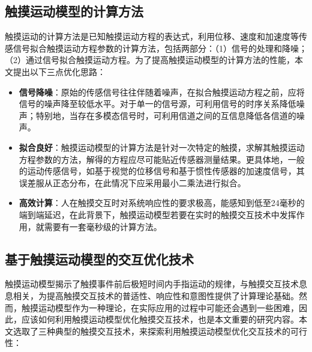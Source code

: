 
\subsection{触摸运动模型的计算方法}

触摸运动的计算方法是已知触摸运动方程的表达式，利用位移、速度和加速度等传感信号拟合触摸运动方程参数的计算方法，包括两部分：（1）信号的处理和降噪；（2）通过信号拟合触摸运动方程。为了提高触摸运动模型的计算方法的性能，本文提出以下三点优化思路：

\begin{itemize}
\item{\textbf{信号降噪}：原始的传感信号往往伴随着噪声，在拟合触摸运动方程之前，应将信号的噪声降至较低水平。对于单一的信号源，可利用信号的时序关系降低噪声；特别地，当存在多模态信号时，可利用信道之间的互信息降低各信道的噪声。}
\item{\textbf{拟合良好}：触摸运动模型的计算方法是针对一次特定的触摸，求解其触摸运动方程参数的方法，解得的方程应尽可能贴近传感器测量结果。更具体地，一般的运动传感信号，如基于视觉的位移信号和基于惯性传感器的加速度信号，其误差服从正态分布，在此情况下应采用最小二乘法进行拟合。}
\item{\textbf{高效计算}：人在触摸交互时对系统响应性的要求极高，能感知到低至24毫秒的端到端延迟\cite{jota2013fast}，在此背景下，触摸运动模型若要在实时的触摸交互技术中发挥作用，就需要有一套毫秒级的计算方法。}
\end{itemize}

\subsection{基于触摸运动模型的交互优化技术}

触摸运动模型揭示了触摸事件前后极短时间内手指运动的规律，与触摸交互技术息息相关，为提高触摸交互技术的普适性、响应性和意图性提供了计算理论基础。然而，触摸运动模型作为一种理论，在实际应用的过程中可能还会遇到一些困难，因此，应该如何利用触摸运动模型优化触摸交互技术，也是本文重要的研究内容。本文选取了三种典型的触摸交互技术，来探索利用触摸运动模型优化交互技术的可行性：

